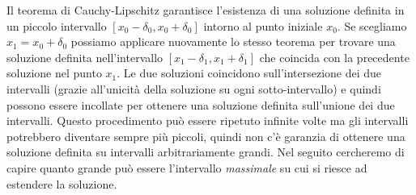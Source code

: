 Il teorema di Cauchy-Lipschitz garantisce l'esistenza di una soluzione
definita in un
piccolo intervallo $[x_0-\delta_0, x_0+\delta_0]$ intorno al punto iniziale $x_0$.
Se scegliamo $x_1 = x_0+\delta_0$ possiamo applicare nuovamente lo stesso
teorema per trovare una soluzione definita nell'intervallo
$[x_1-\delta_1, x_1+\delta_1]$
che coincida con la precedente soluzione nel punto $x_1$.
Le due soluzioni coincidono sull'intersezione dei due intervalli (grazie
all'unicità della soluzione su ogni sotto-intervallo) e quindi possono
essere incollate per ottenere una soluzione definita sull'unione dei due intervalli.
Questo procedimento può essere ripetuto infinite volte ma gli intervalli
potrebbero diventare sempre più piccoli, quindi non c'è garanzia di ottenere una
soluzione definita su intervalli arbitrariamente grandi.
Nel seguito cercheremo di capire quanto grande può essere l'intervallo
\emph{massimale} su cui si riesce ad estendere la soluzione.

